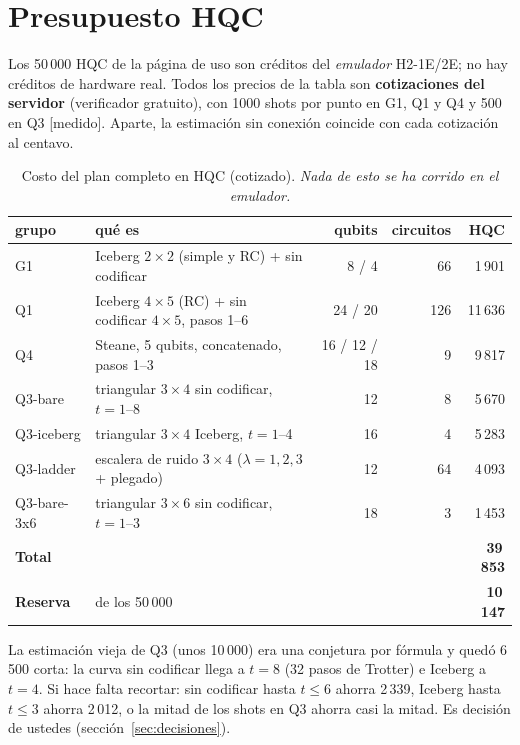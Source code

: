 \documentclass[11pt,a4paper]{article}
\begin{document}
\section{Presupuesto HQC}\label{sec:presupuesto}

Los 50\,000 HQC de la p\'agina de uso son cr\'editos del \emph{emulador} H2-1E/2E; no hay cr\'editos de hardware
real. Todos los precios de la tabla son \textbf{cotizaciones del servidor} (verificador gratuito), con 1000
shots por punto en G1, Q1 y Q4 y 500 en Q3 [medido]. Aparte, la estimaci\'on sin conexi\'on coincide con cada
cotizaci\'on al centavo.

\begin{table}[h]\centering\small
\caption{Costo del plan completo en HQC (cotizado). \emph{Nada de esto se ha corrido en el emulador.}}
\begin{tabular}{llrrr}
\toprule
grupo & qu\'e es & qubits & circuitos & HQC\\
\midrule
G1 & Iceberg $2{\times}2$ (simple y RC) + sin codificar & 8 / 4 & 66 & 1\,901\\
Q1 & Iceberg $4{\times}5$ (RC) + sin codificar $4{\times}5$, pasos 1--6 & 24 / 20 & 126 & 11\,636\\
Q4 & Steane, 5 qubits, concatenado, pasos 1--3 & 16 / 12 / 18 & 9 & 9\,817\\
Q3-bare & triangular $3{\times}4$ sin codificar, $t=1$--8 & 12 & 8 & 5\,670\\
Q3-iceberg & triangular $3{\times}4$ Iceberg, $t=1$--4 & 16 & 4 & 5\,283\\
Q3-ladder & escalera de ruido $3{\times}4$ ($\lambda=1,2,3$ + plegado) & 12 & 64 & 4\,093\\
Q3-bare-3x6 & triangular $3{\times}6$ sin codificar, $t=1$--3 & 18 & 3 & 1\,453\\
\midrule
\textbf{Total} & & & & \textbf{39\,853}\\
\textbf{Reserva} & de los 50\,000 & & & \textbf{10\,147}\\
\bottomrule
\end{tabular}
\end{table}

La estimaci\'on vieja de Q3 (unos 10\,000) era una conjetura por f\'ormula y qued\'o 6\,500 corta: la curva sin
codificar llega a $t=8$ (32 pasos de Trotter) e Iceberg a $t=4$. Si hace falta recortar: sin codificar
hasta $t\le6$ ahorra 2\,339, Iceberg hasta $t\le3$ ahorra 2\,012, o la mitad de los shots en Q3 ahorra casi la
mitad. Es decisi\'on de ustedes (secci\'on~\ref{sec:decisiones}).
\end{document}
